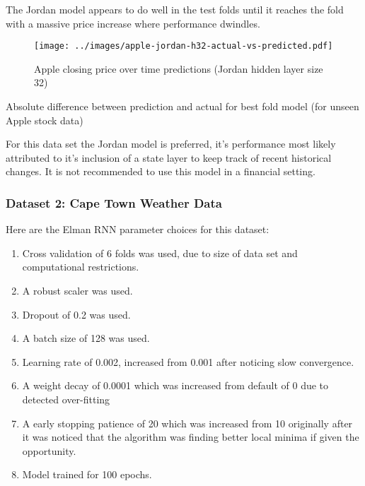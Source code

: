\documentclass[conference]{IEEEtran}
\begin{document}
The Jordan model appears to do well in the test folds until it reaches the fold with a massive price increase where performance dwindles.

\begin{figure}[H] 
	\centering
	\texttt{[image: ../images/apple-jordan-h32-actual-vs-predicted.pdf]}
	\caption{Apple closing price over time predictions (Jordan hidden layer size 32)}
	\label{fig:apple-closing-predictions-jordan}
\end{figure}

\begin{table}[H]
	\caption{Absolute difference between prediction and actual for best fold model (for unseen Apple stock data)}
	\label{tab:apple-rnn-summary}
\end{table}


For this data set the Jordan model is preferred, it's performance most likely attributed to it's inclusion of a state layer to keep track of recent historical changes. It is not recommended to use this model in a financial setting.


\subsubsection{Dataset 2: Cape Town Weather Data}

Here are the Elman RNN parameter choices for this dataset:

\begin{enumerate}[]
	\item Cross validation of 6 folds was used, due to size of data set and computational restrictions.
	\item A robust scaler was used.
	\item Dropout of 0.2 was used.
	\item A batch size of 128 was used.
	\item Learning rate of 0.002, increased from 0.001 after noticing slow convergence.
	\item A weight decay of 0.0001 which was increased from default of 0 due to detected over-fitting
	\item A early stopping patience of 20 which was increased from 10 originally after it was noticed that the algorithm was finding better local minima if given the opportunity.
	\item Model trained for 100 epochs.
\end{enumerate}
\end{document}
